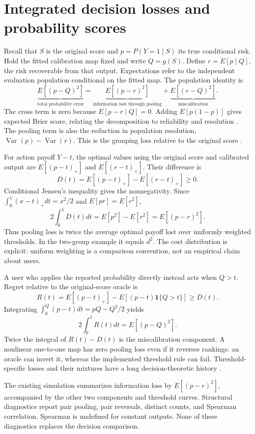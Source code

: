 \documentclass[11pt]{article}
\begin{document}
\section{Integrated decision losses and probability scores}
Recall that $S$ is the original score and $p=P(Y=1\mid S)$ its true conditional risk. Hold the fitted calibration map fixed and write $Q=g(S)$. Define $r=E[p\mid Q]$, the risk recoverable from that output. Expectations refer to the independent evaluation population conditional on the fitted map. The population identity is
\[
\underbrace{E[(p-Q)^2]}_{\text{total probability error}}
=\underbrace{E[(p-r)^2]}_{\text{information lost through pooling}}
+\underbrace{E[(r-Q)^2]}_{\text{miscalibration}}.
\]
The cross term is zero because $E[p-r\mid Q]=0$. Adding $E[p(1-p)]$ gives expected Brier score, relating the decomposition to reliability and resolution \citep{murphy1973,degroot1983comparison}. The pooling term is also the reduction in population resolution, $\operatorname{Var}(p)-\operatorname{Var}(r)$. This is the grouping loss relative to the original score \citep{tasche}.

For action payoff $Y-t$, the optimal values using the original score and calibrated output are $E[(p-t)_+]$ and $E[(r-t)_+]$. Their difference is
\[
D(t)=E[(p-t)_+]-E[(r-t)_+]\geq0.
\]
Conditional Jensen's inequality gives the nonnegativity. Since $\int_0^1(x-t)_+dt=x^2/2$ and $E[pr]=E[r^2]$,
\[
2\int_0^1D(t)dt=E[p^2]-E[r^2]=E[(p-r)^2].
\]
Thus pooling loss is twice the average optimal payoff lost over uniformly weighted thresholds. In the two-group example it equals $d^2$. The cost distribution is explicit: uniform weighting is a comparison convention, not an empirical claim about users.

A user who applies the reported probability directly instead acts when $Q>t$. Regret relative to the original-score oracle is
\[
R(t)=E[(p-t)_+]-E[(p-t)\mathbf1\{Q>t\}]\geq D(t).
\]
Integrating $\int_0^Q(p-t)dt=pQ-Q^2/2$ yields
\[
2\int_0^1R(t)dt=E[(p-Q)^2].
\]
Twice the integral of $R(t)-D(t)$ is the miscalibration component. A nonlinear one-to-one map has zero pooling loss even if it reverses rankings: an oracle can invert it, whereas the implemented threshold rule can fail. Threshold-specific losses and their mixtures have a long decision-theoretic history \citep{ehm}.

The existing simulation summarizes information loss by $E[(p-r)^2]$, accompanied by the other two components and threshold curves. Structural diagnostics report pair pooling, pair reversals, distinct counts, and Spearman correlation. Spearman is undefined for constant outputs. None of these diagnostics replaces the decision comparison.
\end{document}
